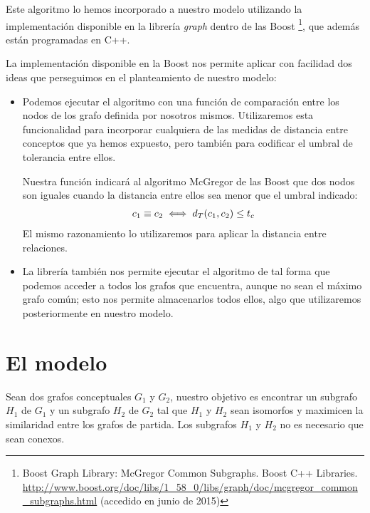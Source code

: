 \documentclass[a4paper,12pt,spanish]{book}
\begin{document}
Este algoritmo lo hemos incorporado a nuestro modelo utilizando la implementación disponible
en la librería \emph{graph} dentro de las Boost \footnote{
Boost Graph Library: McGregor Common Subgraphs. Boost C++ Libraries.
\href{http://www.boost.org/doc/libs/1\_58\_0/libs/graph/doc/mcgregor\_common\_subgraphs.html}{http://www.boost.org/doc/libs/1\_58\_0/libs/graph/doc/mcgregor\_common\_subgraphs.html}
(accedido en junio de 2015)
}, que además están programadas en C++.

La implementación disponible en la Boost nos permite aplicar con facilidad dos ideas
que perseguimos en el planteamiento de nuestro modelo:
\begin{itemize}
\item {} 
Podemos ejecutar el algoritmo con una función de comparación entre los nodos
de los grafo definida por nosotros mismos. Utilizaremos esta funcionalidad para
incorporar cualquiera de las medidas de distancia entre conceptos que ya hemos
expuesto, pero también para codificar el umbral de tolerancia entre ellos.

Nuestra función indicará al algoritmo McGregor de las Boost que dos nodos son
iguales cuando la distancia entre ellos sea menor que el umbral indicado:
\begin{gather}
\begin{split}c_1 \equiv c_2 \iff d_T(c_1, c_2) \leq t_c\end{split}\notag
\end{gather}
El mismo razonamiento lo utilizaremos para aplicar la distancia entre relaciones.

\item {} 
La librería también nos permite ejecutar el algoritmo de tal forma que podemos
acceder a todos los grafos que encuentra, aunque no sean el máximo grafo común;
esto nos permite almacenarlos todos ellos, algo que utilizaremos posteriormente en
nuestro modelo.

\end{itemize}


\section{El modelo}
\label{4.model/ii.modelo::doc}\label{4.model/ii.modelo:el-modelo}
Sean dos grafos conceptuales \(G_1\) y \(G_2\), nuestro objetivo es encontrar un
subgrafo \(H_1\) de \(G_1\) y un subgrafo \(H_2\) de \(G_2\) tal que
\(H_1\) y \(H_2\) sean isomorfos y maximicen la similaridad entre los grafos
de partida. Los subgrafos \(H_1\) y \(H_2\) no es necesario que sean conexos.
\end{document}
